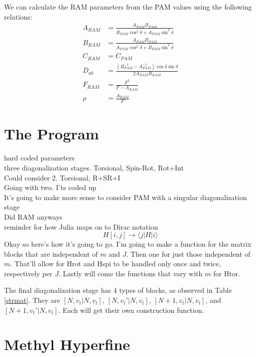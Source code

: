 \documentclass{article}
\begin{document}
We can calculate the RAM parameters from the PAM values using the following relations:
\begin{align}
	A_{RAM} &= \frac{A_{PAM}B_{PAM}}{B_{PAM}\cos^{2}\delta + A_{PAM}\sin^{2}\delta} \\
	B_{RAM} &= \frac{A_{PAM}B_{PAM}}{A_{PAM}\cos^{2}\delta + B_{PAM}\sin^{2}\delta} \\
	C_{RAM} &= C_{PAM} \\
	D_{ab} &= \frac{(B_{PAM}^{-1} - A_{PAM}^{-1})\cos\delta\sin\delta}{2A_{RAM}B_{RAM}}\\
	F_{RAM} &= \frac{F^{2}}{F-A_{RAM}} \\
	\rho &= \frac{A_{RAM}}{F}
\end{align}

\section{The Program}
hard coded parameters \\
three diagonalization stages. Torsional, Spin-Rot, Rot+Int \\
Could consider 2. Torsional, R+SR+I \\
Going with two. I'ts coded up\\
It's going to make more sense to consider PAM with a singular diagonalization stage\\
Did RAM anyways\\
reminder for how Julia maps on to Dirac notation
\begin{equation}
H[i,j] \rightarrow \langle j |H|i\rangle
\end{equation}
Okay so here's how it's going to go. I'm going to make a function for the matrix blocks that are independent of $m$ and $J$. Then one for just those independent of $m$. That'll allow for Hrot and Hspi to be handled only once and twice, respectively per $J$. Lastly will come the functions that vary with $m$ for Htor.\vspace{12pt}

The final diagonalization stage has 4 types of blocks, as observed in Table \ref{strmat}. They are $[N, v_{t}|N, v_{t}]$, $[N, v_{t}'|N, v_{t}]$, $[N+1, v_{t}|N, v_{t}]$, and $[N+1, v_{t}'|N, v_{t}]$. Each will get their own construction function.


\section{Methyl Hyperfine}
\end{document}
